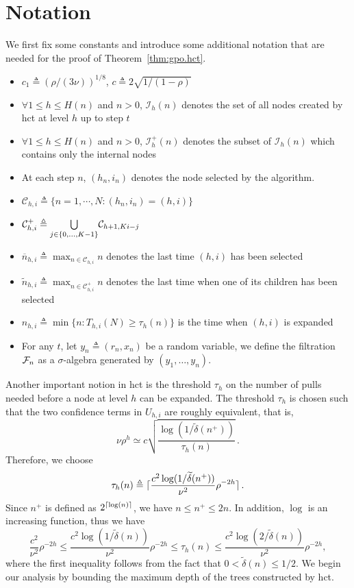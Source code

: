 \section{Notation}\label{app:gpo.notation}

We first fix some constants and introduce some additional notation that are needed for the proof of Theorem~\ref{thm:gpo.hct}.
\begin{itemize}
    \item $c_1 \triangleq (\rho/(3\nu))^{1/8}$, $c \triangleq 2\sqrt{1/(1-\rho)}$
    \item $\forall 1\leq h\leq H(n)$ and $n>0$, $\mathcal{I}_h(n)$ denotes the set of all nodes created by \gls{hct} at level $h$ up to step $t$
    \item $\forall 1\leq h\leq H(n)$ and $n>0$, $\mathcal{I}_h^{+}(n)$ denotes the subset of $\mathcal{I}_h(n)$ which contains only the internal nodes
    \item At each step $n$, $(h_n,i_n)$ denotes the node selected by the algorithm.
    \item $\mathcal{C}_{h,i} \triangleq \{n = 1,\cdots,N : (h_n,i_n) = (h,i)\}$
    \item $\mathcal{C}_{h,i}^{+} \triangleq \underset{j\in\{0,\ldots,K-1\}}{\bigcup} \mathcal{C}_{h+1,Ki-j}$
    \item $\overline{n}_{h,i} \triangleq \max_{n\in\mathcal{C}_{h,i}} n$ denotes the last time $(h,i)$ has been selected
    \item $\tilde{n}_{h,i} \triangleq \max_{n\in\mathcal{C}_{h,i}^{+}} n$ denotes the last time when one of its children has been selected
    \item $n_{h,i} \triangleq \min\{n: T_{h,i}(N) \geq \tau_h(n)\}$ is the time when $(h,i)$ is expanded
    \item For any $t$, let $y_n\triangleq(r_n,x_n)$ be a random variable, we define the filtration $\mathcal{F}_n$ as a $\sigma$-algebra generated by $(y_1,\ldots,y_n)$.
\end{itemize}
Another important notion in \gls{hct} is the threshold $\tau_h$ on the number of pulls needed before a node at level $h$ can be expanded.
The threshold $\tau_h$ is chosen such that the two confidence terms in $U_{h,i}$ are roughly equivalent, that is,
\[
    \nu\rho^h \simeq c\sqrt{\frac{\log(1/\tilde{\delta}(n^+))}{\tau_h(n)}}\,.
\]
Therefore, we choose
\[
    \tau_h(n) \triangleq \lceil\frac{c^2\log(1/\widetilde{\delta}(n^+))}{\nu^2}\rho^{-2h}\rceil\,.
\]
Since $n^+$ is defined as $2^{\lceil\log(n)\rceil}$, we have $n \leq n^+ \leq 2n$. In addition, $\log$ is an increasing function, thus we have
\begin{equation} \label{eq1}
    \frac{c^2}{\nu^2}\rho^{-2h} \leq \frac{c^2 \log(1/\tilde{\delta}(n))}{\nu^2}\rho^{-2h} \leq \tau_h(n) \leq \frac{c^2\log(2/\tilde{\delta}(n))}{\nu^2}\rho^{-2h},
\end{equation}
where the first inequality follows from the fact that $0<\tilde{\delta}(n)\leq1/2$. We begin our analysis by bounding the maximum depth of the trees constructed by \gls{hct}.